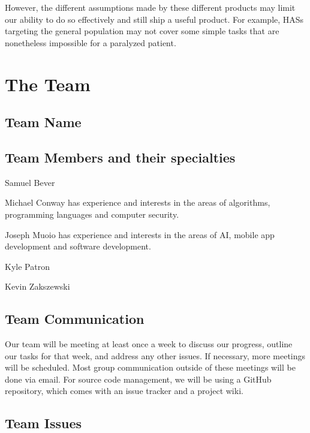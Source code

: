 \documentclass{report}
\begin{document}
However, the different assumptions made by these different products may limit
our ability to do so effectively and still ship a useful product. For example,
HASs targeting the general population may not cover some simple tasks that are
nonetheless impossible for a paralyzed patient.

\newpage
\section*{\centering The Team}

\subsection*{Team Name}


\subsection*{Team Members and their specialties}

Samuel Bever

Michael Conway has experience and interests in the areas of algorithms,
programming languages and computer security. %

Joseph Muoio has experience and interests in the areas of AI, mobile app development and software development.

Kyle Patron

Kevin Zakszewski



\subsection*{Team Communication}

Our team will be meeting at least once a week to discuss our progress, outline
our tasks for that week, and address any other issues. If necessary, more
meetings will be scheduled. Most group communication outside of these meetings
will be done via email. For source code management, we will be using a GitHub
repository, which comes with an issue tracker and a project wiki.

\subsection*{Team Issues}

\end{document}

